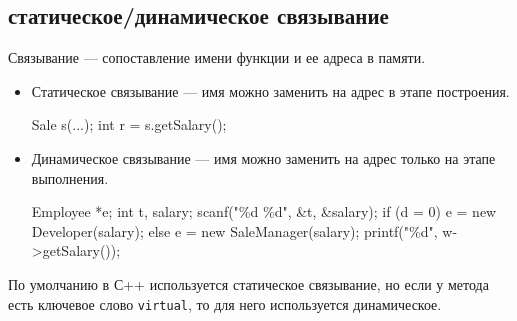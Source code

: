 \subsection{статическое/динамическое связывание}
Связывание --- сопоставление имени функции и ее адреса в памяти.
\begin{itemize}
    \item Статическое связывание --- имя можно заменить на адрес в этапе построения.
\begin{ccode}
Sale s(...);
int r = s.getSalary();
\end{ccode}
\item Динамическое связывание --- имя можно заменить на адрес только на этапе выполнения.
\begin{ccode}
Employee *e;
int t, salary;
scanf("\%d \%d", &t, &salary);
if (d = 0) 
    e = new Developer(salary);
else
    e = new SaleManager(salary);
printf("\%d", w->getSalary());
\end{ccode}
\end{itemize}
По умолчанию в С++ используется статическое связывание, но если у метода есть ключевое слово {\tt virtual}, то для него используется динамическое.
